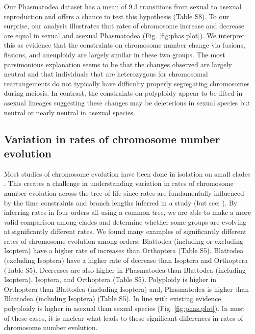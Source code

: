 \documentclass[]{rsos}%
\begin{document}
Our Phasmatodea dataset has a mean of 9.3 transitions from sexual to asexual reproduction and offers a chance to test this hypothesis (Table S8).
To our surprise, our analysis illustrates that rates of chromosome increase and decrease are equal in sexual and asexual Phasmatodea (Fig. \ref{fig:phas.plot}).
We interpret this as evidence that the constraints on chromosome number change via fusions, fissions, and aneuploidy are largely similar in these two groups.
The most parsimonious explanation seems to be that the changes observed are largely neutral and that individuals that are heterozygous for chromosomal rearrangements do not typically have difficulty properly segregating chromosomes during meiosis.
In contrast, the constraints on polyploidy appear to be lifted in asexual lineages suggesting these changes may be deleterious in sexual species but neutral or nearly neutral in asexual species.


\subsection{Variation in rates of chromosome number evolution}
Most studies of chromosome evolution have been done in isolation on small clades \cite{rockman2002, mccann2016, deoliveira}. 
This creates a challenge in understanding variation in rates of chromosome number evolution across the tree of life since rates are fundamentally influenced by the time constraints and branch lengths inferred in a study (but see: \cite{blackmon2019meiotic, zenil2017}).
By inferring rates in four orders all using a common tree, we are able to make a more valid comparison among clades and determine whether some groups are evolving at significantly different rates.
We found many examples of significantly different rates of chromosome evolution among orders.
Blattodea (including or excluding Isoptera) have a higher rate of increases than Orthoptera (Table S5).
Blattodea (excluding Isoptera) have a higher rate of decrease than Isoptera and Orthoptera  (Table S5).
Decreases are also higher in Phasmatodea than Blattodea (including Isoptera), Isoptera, and Orthoptera  (Table S5).
Polyploidy is higher in Orthoptera than Blattodea (including Isoptera) and, Phasmatodea is higher than Blattodea (including Isoptera)  (Table S5).
In line with existing evidence \cite{lokki1980polyploidy, blackmon2016} polyploidy is higher in asexual than sexual species (Fig. \ref{fig:phas.plot}).
In most of these cases, it is unclear what leads to these significant differences in rates of chromosome number evolution.
\end{document}
